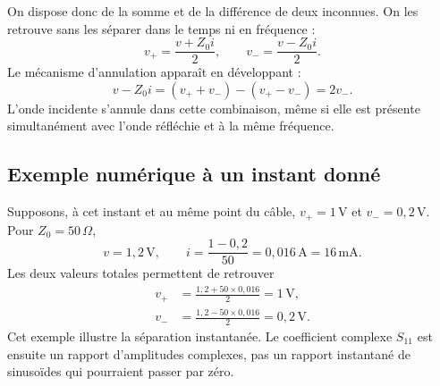 \documentclass[11pt,a4paper]{article}
\begin{document}
On dispose donc de la somme et de la différence de deux inconnues.
On les retrouve sans les séparer dans le temps ni en fréquence :
\begin{equation}
 \boxed{v_+=\frac{v+Z_0i}{2},\qquad v_-=\frac{v-Z_0i}{2}.}
\end{equation}
Le mécanisme d'annulation apparaît en développant :
\begin{equation}
 v-Z_0i=(v_++v_-)-(v_+-v_-)=2v_-.
\end{equation}
L'onde incidente s'annule dans cette combinaison, même si elle est présente
simultanément avec l'onde réfléchie et à la même fréquence.

\subsection{Exemple numérique à un instant donné}
Supposons, à cet instant et au même point du câble,
$v_+=1\,\mathrm V$ et $v_-=0{,}2\,\mathrm V$. Pour $Z_0=50\,\Omega$,
\begin{equation}
 v=1{,}2\,\mathrm V,\qquad
 i=\frac{1-0{,}2}{50}=0{,}016\,\mathrm A=16\,\mathrm{mA}.
\end{equation}
Les deux valeurs totales permettent de retrouver
\begin{align}
 v_+&=\frac{1{,}2+50\times0{,}016}{2}=1\,\mathrm V,\\
 v_-&=\frac{1{,}2-50\times0{,}016}{2}=0{,}2\,\mathrm V.
\end{align}
Cet exemple illustre la séparation instantanée. Le coefficient complexe
$S_{11}$ est ensuite un rapport d'amplitudes complexes, pas un rapport
instantané de sinusoïdes qui pourraient passer par zéro.
\end{document}

